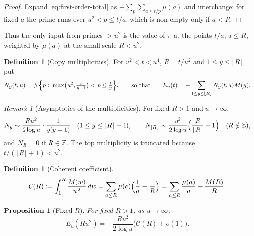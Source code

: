 \documentclass[11pt]{amsart}
\numberwithin{equation}{section}
\theoremstyle{plain}
\newtheorem{proposition}[theorem]{Proposition}
\theoremstyle{definition}
\newtheorem{definition}[theorem]{Definition}
\theoremstyle{remark}
\newtheorem{remark}[theorem]{Remark}
\newcommand{\Cc}{\mathcal{C}}
\begin{document}
\begin{proof}
Expand \eqref{eq:first-order-total} as $-\sum_{p}\sum_{a\le t/p}\mu(a)$ and
interchange: for fixed $a$ the prime runs over $u^2<p\le t/a$, which is
non-empty only if $a<R$.
\end{proof}

Thus the only input from primes $>u^2$ is the value of $\pi$ at the points
$t/a$, $a\le R$, weighted by $\mu(a)$ at the small scale $R<u^2$.

\begin{definition}[Copy multiplicities]
\label{def:copy-multiplicity}
For $u^2<t<u^4$, $R=t/u^2$ and $1\le y\le\lfloor R\rfloor$ put
\begin{equation}
\label{eq:Ny-exact}
  N_y(t,u)=\#\Bigl\{p:\ \max\bigl(u^2,\tfrac{t}{y+1}\bigr)<p\le\tfrac ty\Bigr\},
  \qquad\text{so that}\qquad
  E_u(t)=-\sum_{1\le y\le\lfloor R\rfloor}N_y(t,u)M(y).
\end{equation}
\end{definition}

\begin{remark}[Asymptotics of the multiplicities]
\label{rem:copy-count-asymptotic}
For fixed $R>1$ and $u\to\infty$,
\begin{equation}
\label{eq:Ny-fixed-R}
  N_y\sim\frac{Ru^2}{2\log u}\cdot\frac1{y(y+1)}\quad(1\le y\le\lfloor R\rfloor-1),
  \qquad
  N_{\lfloor R\rfloor}\sim\frac{u^2}{2\log u}\Bigl(\frac R{\lfloor R\rfloor}-1\Bigr)
  \quad(R\notin\mathbb{Z}),
\end{equation}
and $N_R=0$ if $R\in\mathbb{Z}$. The top multiplicity is truncated because
$t/(\lfloor R\rfloor+1)<u^2$.
\end{remark}

\begin{definition}[Coherent coefficient]
\label{def:coherent_coefficient}
\begin{equation}
\label{eq:C_def}
  \Cc(R):=\int_1^R\frac{M(w)}{w^2}\,dw
  =\sum_{a\le R}\mu(a)\Bigl(\frac1a-\frac1R\Bigr)
  =\sum_{a\le R}\frac{\mu(a)}a-\frac{M(R)}R .
\end{equation}
\end{definition}

\begin{proposition}[Fixed $R$]
\label{prop:fixed_R_corrected}
For fixed $R>1$, as $u\to\infty$,
\begin{equation}
\label{eq:E_fixed_R}
  E_u(Ru^2)=-\frac{Ru^2}{2\log u}\bigl(\Cc(R)+o(1)\bigr).
\end{equation}
\end{proposition}
\end{document}
